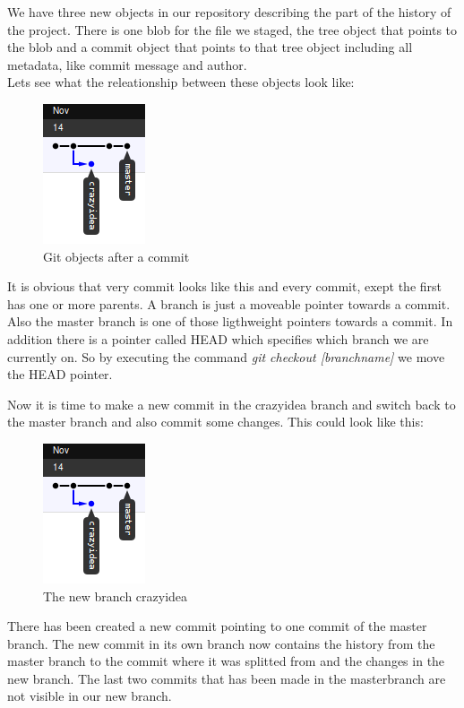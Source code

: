 We have three new objects in our repository describing the part of the history
of the project. There is one blob for the file we staged, the tree object that
points to the blob and a commit object that points to that tree object including
all metadata, like commit message and author. 
\\

Lets see what the releationship between these objects look like:

\begin{figure}[h]
  \includegraphics{img/branch3}
  \caption{Git objects after a commit}
  \label{fig: git objects after a commit}
\end{figure}

It is obvious that very commit looks like this and every commit, exept the first
has one or more parents.
A branch is just a moveable pointer towards a commit. Also the master branch is
one of those ligthweight pointers towards a commit. In addition there is a
pointer called HEAD which specifies which branch we are currently on. So by
executing the command \emph{git checkout [branchname]} we move the HEAD
pointer. 

Now it is time to make a new commit in the crazyidea branch and switch back to
the master branch and also commit some changes.
This could look like this:
\begin{figure}[h]
  \centering
  \includegraphics{img/branch3}
  \caption{The new branch crazyidea}
  \label{fig: a new branch}
\end{figure}

There has been created a new commit pointing to one commit of the master branch.
The new commit in its own branch now contains the history from the master branch
to the commit where it was splitted from and the changes in the new
branch. The last two commits that has been made in the masterbranch are not
visible in our new branch. 

